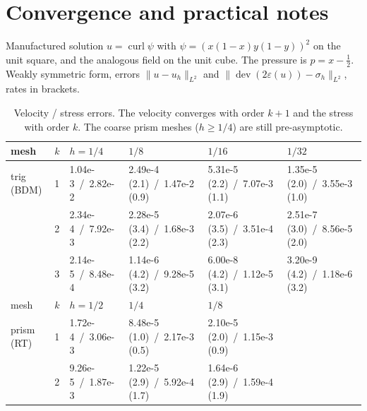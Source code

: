 \documentclass[10pt,a4paper]{article}
\newcommand{\dev}{\operatorname{dev}}
\begin{document}
\section{Convergence and practical notes}

Manufactured solution $u = \operatorname{curl}\psi$ with $\psi = (x(1-x)y(1-y))^2$ on the unit square, and the analogous field on the unit cube. The pressure is $p = x - \tfrac12$. Weakly symmetric form, errors $\|u-u_h\|_{L^2}$ and $\|\dev(2\varepsilon(u)) - \sigma_h\|_{L^2}$, rates in brackets.

\begin{table}[h]\centering\footnotesize\setlength{\tabcolsep}{4pt}
\begin{tabular}{@{}llllll@{}}\toprule
 mesh & $k$ & $h=1/4$ & $1/8$ & $1/16$ & $1/32$\\\midrule
 trig (BDM) & 1 & 1.04e-3\ /\ 2.82e-2 & 2.49e-4 (2.1)\ /\ 1.47e-2 (0.9) & 5.31e-5 (2.2)\ /\ 7.07e-3 (1.1) & 1.35e-5 (2.0)\ /\ 3.55e-3 (1.0)\\
            & 2 & 2.34e-4\ /\ 7.92e-3 & 2.28e-5 (3.4)\ /\ 1.68e-3 (2.2) & 2.07e-6 (3.5)\ /\ 3.51e-4 (2.3) & 2.51e-7 (3.0)\ /\ 8.56e-5 (2.0)\\
            & 3 & 2.14e-5\ /\ 8.48e-4 & 1.14e-6 (4.2)\ /\ 9.28e-5 (3.2) & 6.00e-8 (4.2)\ /\ 1.12e-5 (3.1) & 3.20e-9 (4.2)\ /\ 1.18e-6 (3.2)\\\midrule
 mesh & $k$ & $h=1/2$ & $1/4$ & $1/8$ & \\\midrule
 prism (RT) & 1 & 1.72e-4\ /\ 3.06e-3 & 8.48e-5 (1.0)\ /\ 2.17e-3 (0.5) & 2.10e-5 (2.0)\ /\ 1.15e-3 (0.9) & \\
            & 2 & 9.26e-5\ /\ 1.87e-3 & 1.22e-5 (2.9)\ /\ 5.92e-4 (1.7) & 1.64e-6 (2.9)\ /\ 1.59e-4 (1.9) & \\\bottomrule
\end{tabular}
\caption{Velocity / stress errors. The velocity converges with order $k+1$ and the stress with order $k$. The coarse prism meshes ($h\ge 1/4$) are still pre-asymptotic.}
\end{table}
\end{document}
